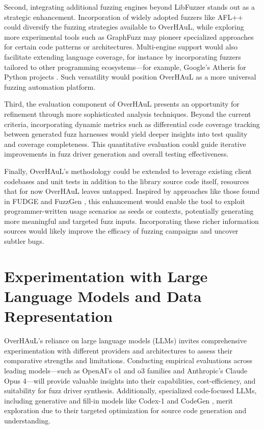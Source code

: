\documentclass[
  a4paper,
]{scrreprt}
\theoremstyle{definition}
\theoremstyle{remark}
\begin{document}
Second, integrating additional fuzzing engines beyond LibFuzzer stands
out as a strategic enhancement. Incorporation of widely adopted fuzzers
like AFL++ \autocite{aflpp} could diversify the fuzzing strategies
available to OverHAuL, while exploring more experimental tools such as
GraphFuzz \autocite{green2022} may pioneer specialized approaches for
certain code patterns or architectures. Multi-engine support would also
facilitate extending language coverage, for instance by incorporating
fuzzers tailored to other programming ecosystems---for example, Google's
Atheris for Python projects \autocite{atheris}. Such versatility would
position OverHAuL as a more universal fuzzing automation platform.

Third, the evaluation component of OverHAuL presents an opportunity for
refinement through more sophisticated analysis techniques. Beyond the
current criteria, incorporating dynamic metrics such as differential
code coverage tracking between generated fuzz harnesses would yield
deeper insights into test quality and coverage completeness. This
quantitative evaluation could guide iterative improvements in fuzz
driver generation and overall testing effectiveness.

Finally, OverHAuL's methodology could be extended to leverage existing
client codebases and unit tests in addition to the library source code
itself, resources that for now OverHAuL leaves untapped. Inspired by
approaches like those found in FUDGE and FuzzGen
\autocite{fuzzgen,fudge}, this enhancement would enable the tool to
exploit programmer-written usage scenarios as seeds or contexts,
potentially generating more meaningful and targeted fuzz inputs.
Incorporating these richer information sources would likely improve the
efficacy of fuzzing campaigns and uncover subtler bugs.

\section{Experimentation with Large Language Models and Data
Representation}\label{experimentation-with-large-language-models-and-data-representation}

OverHAuL's reliance on large language models (LLMs) invites
comprehensive experimentation with different providers and architectures
to assess their comparative strengths and limitations. Conducting
empirical evaluations across leading models---such as OpenAI's o1 and o3
families and Anthropic's Claude Opus 4---will provide valuable insights
into their capabilities, cost-efficiency, and suitability for fuzz
driver synthesis. Additionally, specialized code-focused LLMs, including
generative and fill-in models like Codex-1 and CodeGen
\autocite{nijkamp2023a,nijkamp2023,openai2025a}, merit exploration due
to their targeted optimization for source code generation and
understanding.
\end{document}

